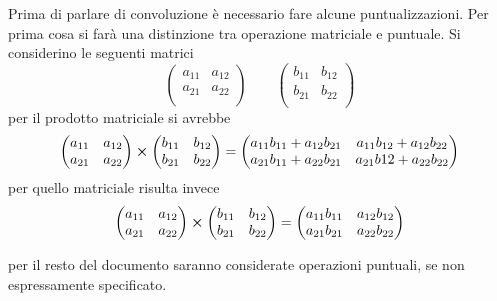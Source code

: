 \documentclass{subfiles}
\begin{document}
Prima di parlare di convoluzione è necessario fare alcune puntualizzazioni.
Per prima cosa si farà una distinzione tra operazione matriciale e puntuale. Si considerino le seguenti matrici
\[
    \begin{pmatrix}
        a_{11} & a_{12} \\
        a_{21} & a_{22} \\
    \end{pmatrix}
    \qquad
    \begin{pmatrix}
        b_{11} & b_{12} \\
        b_{21} & b_{22} \\
    \end{pmatrix}
\]
per il prodotto matriciale si avrebbe
\[
    \begin{pmatrix}
        a_{11} & a_{12} \\
        a_{21} & a_{22} \\
    \end{pmatrix}
    \cp
    \begin{pmatrix}
        b_{11} & b_{12} \\
        b_{21} & b_{22} \\
    \end{pmatrix}
    =
    \begin{pmatrix}
        a_{11}b_{11} + a_{12}b_{21} & a_{11}b_{12} + a_{12}b_{22} \\
        a_{21}b_{11} + a_{22}b_{21} & a_{21}b{12} + a_{22}b_{22}  \\
    \end{pmatrix}
\]
per quello matriciale risulta invece
\[
    \begin{pmatrix}
        a_{11} & a_{12} \\
        a_{21} & a_{22} \\
    \end{pmatrix}
    \cp
    \begin{pmatrix}
        b_{11} & b_{12} \\
        b_{21} & b_{22} \\
    \end{pmatrix}
    =
    \begin{pmatrix}
        a_{11}b_{11} & a_{12}b_{12} \\
        a_{21}b_{21} & a_{22}b_{22} \\
    \end{pmatrix}
\]

\begin{Note*}
    per il resto del documento saranno considerate operazioni puntuali, se non espressamente specificato.
\end{Note*}
\end{document}

